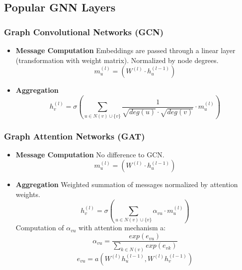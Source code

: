 \documentclass[parskip=full]{scrartcl}
\begin{document}
\subsection{Popular GNN Layers}

\subsubsection{Graph Convolutional Networks (GCN)}
\begin{itemize}
	\item[] \textbf{Message Computation}\newline
		Embeddings are passed through a linear layer (transformation with 		weight matrix). Normalized by node degrees.
		\[m_u^{(l)} = \left(W^{(l)} \cdot h_u^{(l-1)}\right)\]
	\item[] \textbf{Aggregation}\newline
		\[h_v^{(l)} = \sigma\left(\sum_{u \in N(v) \cup \{v\}} \frac{1}{\sqrt{deg(u)} \cdot \sqrt{deg(v)}} \cdot m_u^{(l)}\right)\]
\end{itemize}

\subsubsection{Graph Attention Networks (GAT)}
\begin{itemize}
	\item[] \textbf{Message Computation}\newline
		No difference to GCN.
		\[m_u^{(l)} = \left(W^{(l)} \cdot h_u^{(l-1)}\right)\]
	\item[] \textbf{Aggregation}\newline
		Weighted summation of messages normalized by attention weights.
		\[h_v^{(l)} = \sigma\left(\sum_{u \in N(v) \cup \{v\}} \alpha_{vu} \cdot m_u^{(l)}\right)\]
		Computation of $\alpha_{vu}$ with attention mechanism a:
		\[\alpha_{vu} = \frac{exp(e_{vu})}{\sum_{k \in N(v)} exp(e_{vk})}\]
		\[e_{vu} = a\left(W^{(l)}h_u^{(l-1)}, W^{(l)}h_v^{(l-1)}\right)\]
\end{itemize}
\end{document}
